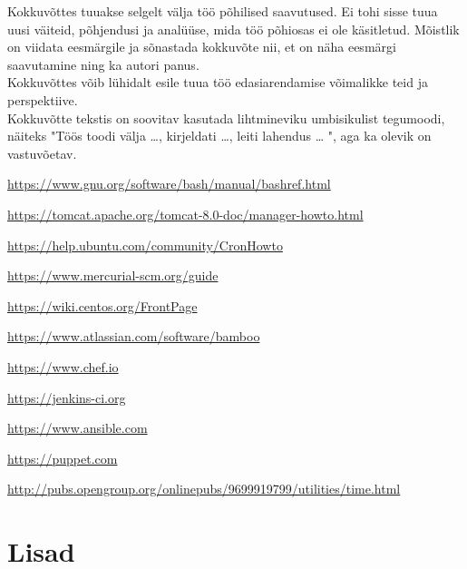 \documentclass[12pt]{report}
\begin{document}
Kokkuvõttes tuuakse selgelt välja töö põhilised saavutused. Ei tohi sisse tuua uusi väiteid, põhjendusi ja analüüse, mida töö põhiosas ei ole käsitletud. Mõistlik on viidata eesmärgile ja sõnastada kokkuvõte nii, et on näha eesmärgi saavutamine ning ka autori panus.\\

Kokkuvõttes võib lühidalt esile tuua töö edasiarendamise võimalikke teid ja perspektiive.\\

Kokkuvõtte tekstis on soovitav kasutada lihtmineviku umbisikulist tegumoodi, näiteks "Töös toodi välja …, kirjeldati …, leiti lahendus … ", aga ka olevik on vastuvõetav.

  \newpage
  
  \begin{thebibliography}{9}
    \label{kasutatud-materjalid}
  
    \url{https://www.gnu.org/software/bash/manual/bashref.html}
    
    \url{https://tomcat.apache.org/tomcat-8.0-doc/manager-howto.html}
  
    \url{https://help.ubuntu.com/community/CronHowto}
  
    \url{https://www.mercurial-scm.org/guide}
  
    \url{https://wiki.centos.org/FrontPage}
  
    \url{https://www.atlassian.com/software/bamboo}
  
    \url{https://www.chef.io}
  
    \url{https://jenkins-ci.org}
  
    \url{https://www.ansible.com}
    
    \url{https://puppet.com}
    
    \url{http://pubs.opengroup.org/onlinepubs/9699919799/utilities/time.html}
 
  \end{thebibliography}

  \newpage
  
  \section*{Lisad}
  \label{lisad}
  
\end{document}
